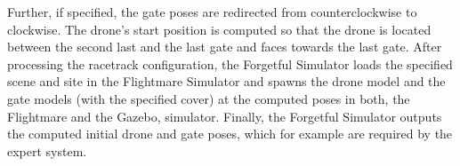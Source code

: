 Further, if specified, the gate poses
are redirected from counterclockwise to clockwise.
The drone's start position is computed so that
the drone is located 
between the second last and the last gate
and faces towards the last gate.
After processing the racetrack configuration,
the Forgetful Simulator loads the specified scene and site in 
the Flightmare Simulator and spawns the drone model 
and the gate models (with the specified cover)
at the computed poses
in both, the Flightmare and the Gazebo, simulator.
Finally, the Forgetful Simulator
outputs the computed initial drone and gate poses,
which for example are required by the expert system.




\begin{figure}[h]
    \newcommand{\dimmm}{0.42\textwidth}
    \newcommand{\dimmmb}{0.1\textwidth}
    \newcommand{\vertspace}{-3ex}


\end{figure}
